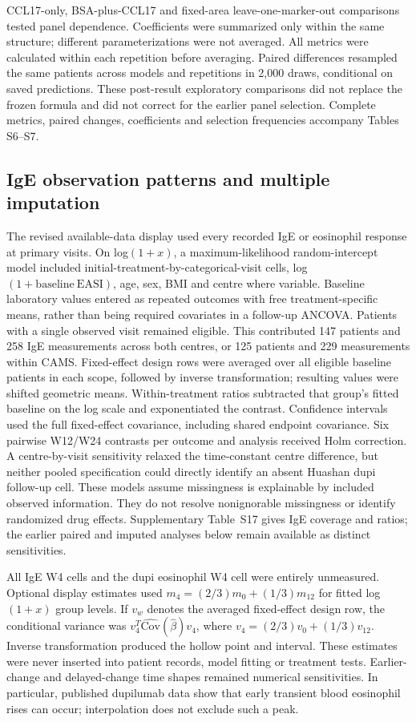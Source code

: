 CCL17-only, BSA-plus-CCL17 and fixed-area leave-one-marker-out comparisons tested panel dependence. Coefficients were summarized only within the same structure; different parameterizations were not averaged. All metrics were calculated within each repetition before averaging. Paired differences resampled the same patients across models and repetitions in 2,000 draws, conditional on saved predictions. These post-result exploratory comparisons did not replace the frozen formula and did not correct for the earlier panel selection. Complete metrics, paired changes, coefficients and selection frequencies accompany Tables S6--S7.

\subsection*{IgE observation patterns and multiple imputation}
The revised available-data display used every recorded IgE or eosinophil response at primary visits. On log$(1+x)$, a maximum-likelihood random-intercept model included initial-treatment-by-categorical-visit cells, log$(1+\mathrm{baseline\ EASI})$, age, sex, BMI and centre where variable. Baseline laboratory values entered as repeated outcomes with free treatment-specific means, rather than being required covariates in a follow-up ANCOVA. Patients with a single observed visit remained eligible. This contributed 147 patients and 258 IgE measurements across both centres, or 125 patients and 229 measurements within CAMS. Fixed-effect design rows were averaged over all eligible baseline patients in each scope, followed by inverse transformation; resulting values were shifted geometric means. Within-treatment ratios subtracted that group's fitted baseline on the log scale and exponentiated the contrast. Confidence intervals used the full fixed-effect covariance, including shared endpoint covariance. Six pairwise W12/W24 contrasts per outcome and analysis received Holm correction. A centre-by-visit sensitivity relaxed the time-constant centre difference, but neither pooled specification could directly identify an absent Huashan dupi follow-up cell. These models assume missingness is explainable by included observed information. They do not resolve nonignorable missingness or identify randomized drug effects. Supplementary Table~S17 gives IgE coverage and ratios; the earlier paired and imputed analyses below remain available as distinct sensitivities.

All IgE W4 cells and the dupi eosinophil W4 cell were entirely unmeasured. Optional display estimates used $m_4=(2/3)m_0+(1/3)m_{12}$ for fitted log$(1+x)$ group levels. If $v_w$ denotes the averaged fixed-effect design row, the conditional variance was $v_4^T\widehat{\mathrm{Cov}}(\widehat\beta)v_4$, where $v_4=(2/3)v_0+(1/3)v_{12}$. Inverse transformation produced the hollow point and interval. These estimates were never inserted into patient records, model fitting or treatment tests. Earlier-change and delayed-change time shapes remained numerical sensitivities. In particular, published dupilumab data show that early transient blood eosinophil rises can occur; interpolation does not exclude such a peak.\citep{wechsler2022eosinophils}

